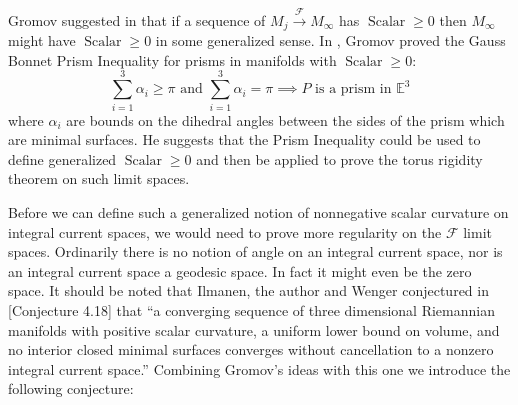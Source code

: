 \documentclass[12pt]{amsart}
\begin{document}
Gromov suggested in \cite{Gromov-Plateau} that if a sequence of $M_j {\stackrel {\mathcal{F}}{\longrightarrow} } M_\infty$ has ${\operatorname{Scalar}}\ge 0$ then $M_\infty$ might have ${\operatorname{Scalar}}\ge 0$ in some generalized sense.  In \cite{Gromov-Dirac}, Gromov proved the Gauss Bonnet
Prism Inequality for prisms in manifolds with ${\operatorname{Scalar}}\ge 0$: 
\begin{equation}\label{Prism}
\sum_{i=1}^3 \alpha_i \ge \pi  \textrm{ and } \sum_{i=1}^3 \alpha_i = \pi\implies
P \textrm{ is a prism in } \mathbb{E}^3
\end{equation}
where $\alpha_i$ are bounds on the dihedral angles between the sides of the
prism which are minimal surfaces.   He suggests that the Prism Inequality
could be used to define generalized ${\operatorname{Scalar}}\ge 0$ and then be applied to prove the torus
rigidity theorem on such limit spaces.  

Before we can define such a generalized notion of nonnegative scalar curvature
on integral current spaces, we would need to prove more regularity on the
$\mathcal{F}$ limit spaces.  Ordinarily there is no notion of angle on an integral
current space, nor is an integral current space a geodesic space.  In fact it might
even be the zero space. It should be noted that Ilmanen, the author and Wenger
conjectured in \cite{SorWen2}[Conjecture 4.18] that ``a converging sequence of three dimensional Riemannian manifolds with positive scalar curvature, a uniform lower bound on volume, and no interior closed minimal surfaces converges 
without cancellation to a nonzero integral current space.''  Combining Gromov's
ideas with this one we introduce the following conjecture:
\end{document}

